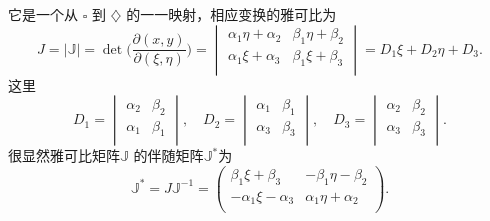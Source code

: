 \documentclass[10pt,reqno, final]{ctexartutf8}
\begin{document}
它是一个从 $\square$ 到 $\diamondsuit$ 的一一映射，相应变换的雅可比为
\begin{equation}\label{J}
J=|\mathbb J|=\det\Bigg(\frac{\partial(x,y)}{\partial(\xi, \eta)}\Bigg)
=
 \begin{vmatrix}
      \alpha_1\eta+\alpha_2 &  \beta_1\eta+\beta_2 \\
      \alpha_1\xi+\alpha_3 &  \beta_1\xi+\beta_3 \\
    \end{vmatrix}
=D_1\xi+D_2\eta+D_3
 .
\end{equation}
这里
\begin{equation}\label{jacobianpara}
D_1=\begin{vmatrix}
      \alpha_2 &  \beta_2 \\
      \alpha_1 &  \beta_1 \\
    \end{vmatrix},\quad D_2=\begin{vmatrix}
      \alpha_1 &  \beta_1 \\
      \alpha_3 &  \beta_3 \\
    \end{vmatrix},\quad D_3=\begin{vmatrix}
      \alpha_2 &  \beta_2 \\
      \alpha_3 &  \beta_3 \\
    \end{vmatrix}.
\end{equation}
很显然雅可比矩阵$\mathbb J$ 的伴随矩阵$\mathbb J^{*}$为
\begin{equation}
\mathbb J^{*} =
J\mathbb J^{-1}=\begin{pmatrix}
      \beta_1\xi+\beta_3 &  -\beta_1\eta-\beta_2 \\
      -\alpha_1\xi-\alpha_3 &   \alpha_1\eta+\alpha_2\\
    \end{pmatrix}.
\end{equation}
\end{document}
